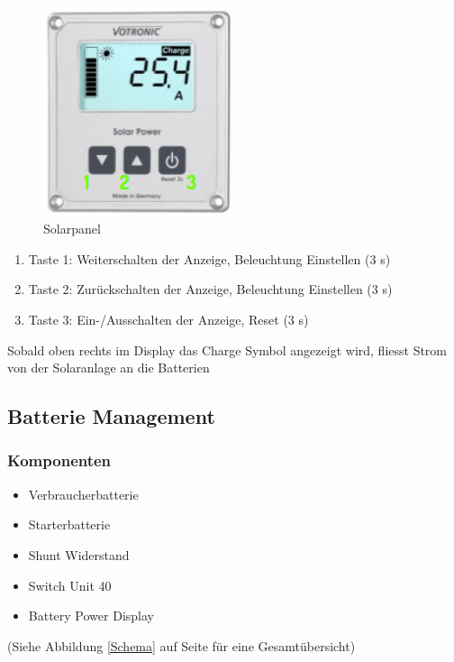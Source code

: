 \begin{figure}[H]
	\centering
  \includegraphics[width=0.5\textwidth]{../Bilder/Anleitung/Solarcomputer.png}
	\caption{Solarpanel}
    \label{Solarpanel}
\end{figure}

\begin{enumerate}
    \item Taste 1: Weiterschalten der Anzeige, Beleuchtung Einstellen (3 s)
    \item Taste 2: Zurückschalten der Anzeige, Beleuchtung Einstellen (3 s)
    \item Taste 3: Ein-/Ausschalten der Anzeige, Reset (3 s)
\end{enumerate}

Sobald oben rechts im Display das \glqq Charge\grqq{} Symbol angezeigt wird, fliesst Strom von der Solaranlage an die Batterien

\newpage
\subsection{Batterie Management}
\subsubsection{Komponenten}
\begin{itemize}
     \item Verbraucherbatterie
     \item Starterbatterie
     \item Shunt Widerstand
     \item Switch Unit 40
     \item Battery Power Display
\end{itemize} 

(Siehe Abbildung \ref{Schema} auf Seite \pageref{Schema} für eine Gesamtübersicht)

